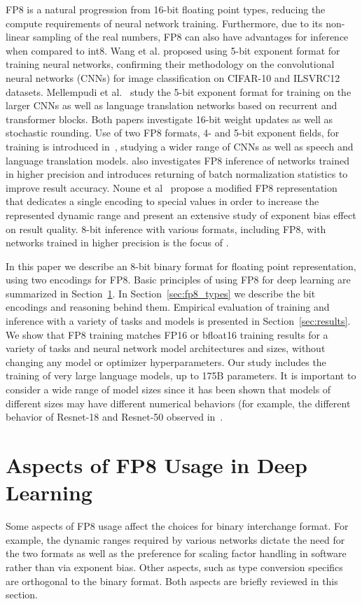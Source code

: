  FP8 is a natural progression from 16-bit floating point types, reducing the compute requirements of neural network training. Furthermore, due to its non-linear sampling of the real numbers, FP8 can also have advantages for inference when compared to int8. Wang et al. \cite{fp8_ibm_2018} proposed using 5-bit exponent format for training neural networks, confirming their methodology on the convolutional neural networks (CNNs) for image classification on CIFAR-10 and ILSVRC12 datasets. Mellempudi et al.~\cite{fp8_intel_2019} study the 5-bit exponent format for training on the larger CNNs as well as language translation networks based on recurrent and transformer blocks. Both papers investigate 16-bit weight updates as well as stochastic rounding. Use of two FP8 formats, 4- and 5-bit exponent fields, for training is introduced in~\cite{fp8_ibm_2019}, studying a wider range of CNNs as well as speech and language translation models. \cite{fp8_ibm_2019} also investigates FP8 inference of networks trained in higher precision and introduces returning of batch normalization statistics to improve result accuracy. Noune et al~\cite{fp8_gc_2022} propose a modified FP8 representation that dedicates a single encoding to special values in order to increase the represented dynamic range and present an extensive study of exponent bias effect on result quality. 8-bit inference with various formats, including FP8, with networks trained in higher precision is the focus of \cite{fp8_qcomm_2022}.

 In this paper we describe an 8-bit binary format for floating point representation, using two encodings for FP8. Basic principles of using FP8 for deep learning are summarized in Section~\ref{sec:dl_use}. In Section~\ref{sec:fp8_types} we describe the bit encodings and reasoning behind them. Empirical evaluation of training and inference with a variety of tasks and models is presented in Section~\ref{sec:results}. We show that FP8 training matches FP16 or bfloat16 training results for a variety of tasks and neural network model architectures and sizes, without changing any model or optimizer hyperparameters. Our study includes the training of very large language models, up to 175B parameters. It is important to consider a wide range of model sizes since it has been shown that models of different sizes may have different numerical behaviors (for example, the different behavior of Resnet-18 and Resnet-50 observed in~\cite{fp8_intel_2019}.

\section{Aspects of FP8 Usage in Deep Learning}
\label{sec:dl_use}
Some aspects of FP8 usage affect the choices for binary interchange format. For example, the dynamic ranges required by various networks dictate the need for the two formats as well as the preference for scaling factor handling in software rather than via exponent bias. Other aspects, such as type conversion specifics are orthogonal to the binary format. Both aspects are briefly reviewed in this section.

